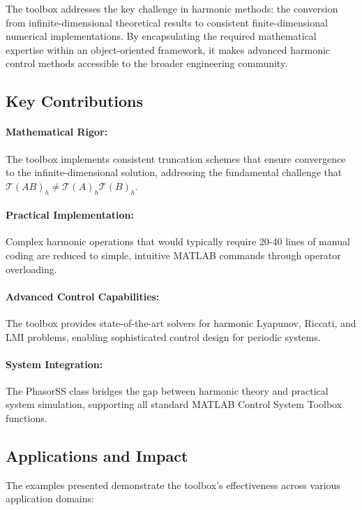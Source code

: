 \documentclass[11pt,a4paper]{article}
\begin{document}
The toolbox addresses the key challenge in harmonic methods: the conversion from infinite-dimensional theoretical results to consistent finite-dimensional numerical implementations. By encapsulating the required mathematical expertise within an object-oriented framework, it makes advanced harmonic control methods accessible to the broader engineering community.

\subsection{Key Contributions}

\paragraph{Mathematical Rigor:} The toolbox implements consistent truncation schemes that ensure convergence to the infinite-dimensional solution, addressing the fundamental challenge that $\mathcal{T}(AB)_h \neq \mathcal{T}(A)_h \mathcal{T}(B)_h$.

\paragraph{Practical Implementation:} Complex harmonic operations that would typically require 20-40 lines of manual coding are reduced to simple, intuitive MATLAB commands through operator overloading.

\paragraph{Advanced Control Capabilities:} The toolbox provides state-of-the-art solvers for harmonic Lyapunov, Riccati, and LMI problems, enabling sophisticated control design for periodic systems.

\paragraph{System Integration:} The PhasorSS class bridges the gap between harmonic theory and practical system simulation, supporting all standard MATLAB Control System Toolbox functions.

\subsection{Applications and Impact}

The examples presented demonstrate the toolbox's effectiveness across various application domains:
\end{document}
